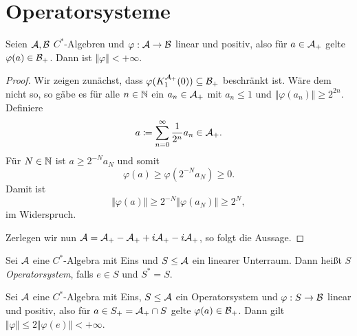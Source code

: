 \chapter{Operatorsysteme}

\begin{lemma}
    Seien $\mathcal{A}, \mathcal{B}$ $C^*$-Algebren und $\varphi : \mathcal{A} \to \mathcal{B}$ linear und positiv, also für $a \in \mathcal{A}_+$ gelte $\varphi(a) \in \mathcal{B}_+$. Dann ist $\Vert \varphi \Vert < +\infty$.
\end{lemma}

\begin{proof}
    Wir zeigen zunächst, dass $\varphi(K_1^{\mathcal{A}_+}(0)) \subseteq \mathcal{B}_+$ beschränkt ist. Wäre dem nicht so, so gäbe es für alle $n \in \mathbb{N}$ ein $a_n \in \mathcal{A}_+$ mit $a_n \leq 1$ und $\Vert \varphi(a_n) \Vert \geq 2^{2n}$. Definiere
    \[
        a \coloneqq \sum_{n=0}^\infty \frac{1}{2^n} a_n \in \mathcal{A}_+.
    \]
    Für $N \in \mathbb{N}$ ist $a \geq 2^{-N} a_N$ und somit
    \[
        \varphi(a) \geq \varphi(2^{-N} a_N) \geq 0.
    \]
    Damit ist
    \[
        \Vert \varphi(a) \Vert \geq 2^{-N} \Vert \varphi(a_N) \Vert \geq 2^N,
    \]
    im Widerspruch.

    Zerlegen wir nun $\mathcal{A} = \mathcal{A}_+ - \mathcal{A}_+ + i\mathcal{A}_+ - i\mathcal{A}_+$, so folgt die Aussage.
\end{proof}

\begin{definition}
    Sei $\mathcal{A}$ eine $C^*$-Algebra mit Eins und $S \leq \mathcal{A}$ ein linearer Unterraum. Dann heißt $S$ \emph{Operatorsystem}, falls $e \in S$ und $S^* = S$.
\end{definition}

\begin{lemma}
    Sei $\mathcal{A}$ eine $C^*$-Algebra mit Eins, $S \leq \mathcal{A}$ ein Operatorsystem und $\varphi : S \to \mathcal{B}$ linear und positiv, also für $a \in S_+ = \mathcal{A}_+ \cap S$ gelte $\varphi(a) \in \mathcal{B}_+$. Dann gilt $\Vert \varphi \Vert \leq 2 \Vert \varphi(e) \Vert < +\infty$.
\end{lemma}

